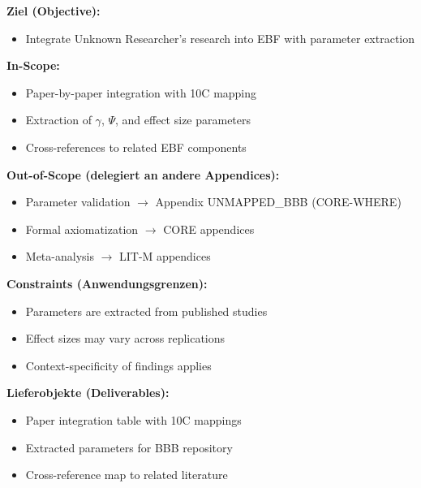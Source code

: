 \begin{tcolorbox}[
    colback=orange!5!white,
    colframe=orange!75!black,
    title={\textbf{Appendix Scope: Ziel / In-Scope / Out-of-Scope / Constraints}},
    fonttitle=\bfseries
]

\textbf{Ziel (Objective):}
\begin{itemize}[nosep]
    \item Integrate Unknown Researcher's research into EBF with parameter extraction
\end{itemize}

\textbf{In-Scope:}
\begin{itemize}[nosep]
    \item Paper-by-paper integration with 10C mapping
    \item Extraction of $\gamma$, $\Psi$, and effect size parameters
    \item Cross-references to related EBF components
\end{itemize}

\textbf{Out-of-Scope (delegiert an andere Appendices):}
\begin{itemize}[nosep]
    \item Parameter validation $\rightarrow$ Appendix UNMAPPED_BBB (CORE-WHERE)
    \item Formal axiomatization $\rightarrow$ CORE appendices
    \item Meta-analysis $\rightarrow$ LIT-M appendices
\end{itemize}

\textbf{Constraints (Anwendungsgrenzen):}
\begin{itemize}[nosep]
    \item Parameters are extracted from published studies
    \item Effect sizes may vary across replications
    \item Context-specificity of findings applies
\end{itemize}

\textbf{Lieferobjekte (Deliverables):}
\begin{itemize}[nosep]
    \item Paper integration table with 10C mappings
    \item Extracted parameters for BBB repository
    \item Cross-reference map to related literature
\end{itemize}

\end{tcolorbox}


